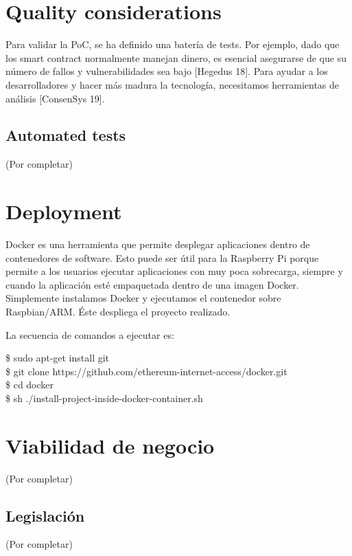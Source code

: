 \documentclass[12pt]{amsart}
\begin{document}
\begin{multicols}{2}
\section{Quality considerations}\label{sec:proofs}
Para validar la PoC, se ha definido una batería de tests. Por ejemplo, dado que los smart contract normalmente manejan dinero, es esencial asegurarse de que su número de fallos y vulnerabilidades sea bajo [Hegedus 18]. Para ayudar a los desarrolladores y hacer más madura la tecnología, necesitamos herramientas de análisis [ConsenSys 19].
\subsection{Automated tests} \label{ch:tests}
(Por completar)

\section{Deployment}\label{sec:deploy}
Docker es una herramienta que permite desplegar aplicaciones dentro de contenedores de software. Esto puede ser útil para la Raspberry Pi porque permite a los usuarios ejecutar aplicaciones con muy poca sobrecarga, siempre y cuando la aplicación esté empaquetada dentro de una imagen Docker. Simplemente instalamos Docker y ejecutamos el contenedor sobre Raspbian/ARM. Éste despliega el proyecto realizado.

La secuencia de comandos a ejecutar es:
\\
\begin{flushleft}
\$ sudo apt-get install git
\\
\$ git clone https://github.com/ethereum-internet-access/docker.git
\\
\$ cd docker
\\
\$ sh ./install-project-inside-docker-container.sh
\end{flushleft}
\section{Viabilidad de negocio}\label{sec:business}
(Por completar)
\subsection{Legislación} \label{ch:legislation}
(Por completar)

\end{multicols}
\end{document}
